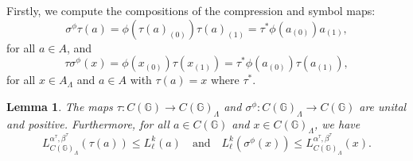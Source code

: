 \documentclass[12pt, reqno]{amsart}
\newtheorem{lemma}[theorem]{Lemma}
\theoremstyle{definition}
\theoremstyle{remark}
\numberwithin{equation}{section}
\begin{document}
Firstly, we compute the compositions of the compression and symbol maps:
\begin{equation}
\sigma^\phi \tau(a) = \phi(\tau(a)_{(0)}) \tau(a)_{(1)} = \tau^*\phi(a_{(0)}) a_{(1)},
\end{equation}
for all $a \in A$, and
\begin{equation}
\tau \sigma^\phi(x) = \phi(x_{(0)}) \tau(x_{(1)}) = \tau^*\phi(a_{(0)}) \tau(a_{(1)}),
\end{equation}
for all $x \in A_{\Lambda}$ and $a \in A$ with $\tau(a) = x$ where $\tau^*$.


\begin{lemma}
    The maps $\tau: C(\mathbb{G}) \to C(\mathbb{G})_\Lambda$ and $\sigma^\phi : C(\mathbb{G})_\Lambda \to C(\mathbb{G})$ are unital and positive. Furthermore, for all $a \in C(\mathbb{G})$ and $x \in C(\mathbb{G})_\Lambda$, we have
    \[
        L_{C(\mathbb{G})_\Lambda}^{\alpha^{\tau},\beta^{\tau}}(\tau(a)) \leq L_\ell^k(a)
        \quad\text{and}\quad
        L_\ell^k(\sigma^\phi(x)) \leq L_{C(\mathbb{G})_\Lambda}^{\alpha^{\tau},\beta^{\tau}}(x).
    \]
\end{lemma}
\end{document}
